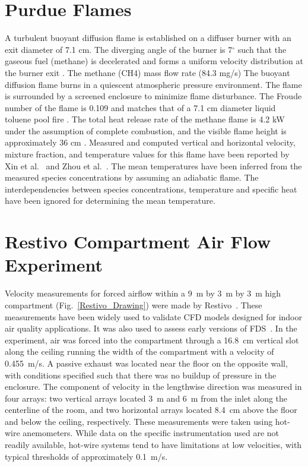 \section{Purdue Flames}

A turbulent buoyant diffusion flame is established on a diffuser burner with an exit diameter of 7.1 cm. The diverging angle of the burner is 7$^\circ$ such that the gaseous fuel (methane) is decelerated and forms a uniform velocity distribution at the burner exit \cite{Xin:CF2005}. The methane (CH4) mass flow rate (84.3 mg/s) The buoyant diffusion flame burns in a quiescent atmospheric pressure environment. The flame is surrounded by a screened enclosure to minimize flame disturbance. The Froude number of the flame is 0.109 and matches that of a 7.1 cm diameter liquid toluene pool fire \cite{Xin:CF2005,Zhou:CS1998}. The total heat release rate of the methane flame is 4.2 kW under the assumption of complete combustion, and the visible flame height is approximately 36 cm \cite{Xin:CF2005}. Measured and computed vertical and horizontal velocity, mixture fraction, and temperature values for this flame have been reported by Xin et al.~\cite{Xin:CF2005,Xin:PhD2002} and Zhou et al.~\cite{Zhou:CS1998,Zhou:PurduePhD1999}. The mean temperatures have been inferred from the measured species concentrations \cite{Xin:CF2005} by assuming an adiabatic flame. The interdependencies between species concentrations, temperature and specific heat have been ignored for determining the mean temperature.

\section{Restivo Compartment Air Flow Experiment}

Velocity measurements for forced airflow within a 9~m by 3~m by 3~m high compartment (Fig.~\ref{Restivo_Drawing}) were made by Restivo~\cite{Restivo:1979}. These measurements have been widely used to validate CFD models designed for indoor air quality applications. It was also used to assess early versions of FDS~\cite{Emmerich:1,Emmerich:2,Musser:1}. In the experiment, air was forced into the compartment through a 16.8~cm vertical slot along the ceiling running the width of the compartment with a velocity of 0.455~m/s. A passive exhaust was located near the floor on the opposite wall, with conditions specified such that there was no buildup of pressure in the enclosure. The component of velocity in the lengthwise direction was measured in four arrays: two vertical arrays located 3~m and 6~m  from the inlet along the
centerline of the room, and two horizontal arrays located 8.4~cm above the floor and below the ceiling, respectively. These measurements were taken using hot-wire anemometers. While data on the specific instrumentation used are not readily available, hot-wire systems tend to have limitations at low velocities, with typical thresholds of approximately 0.1~m/s.

